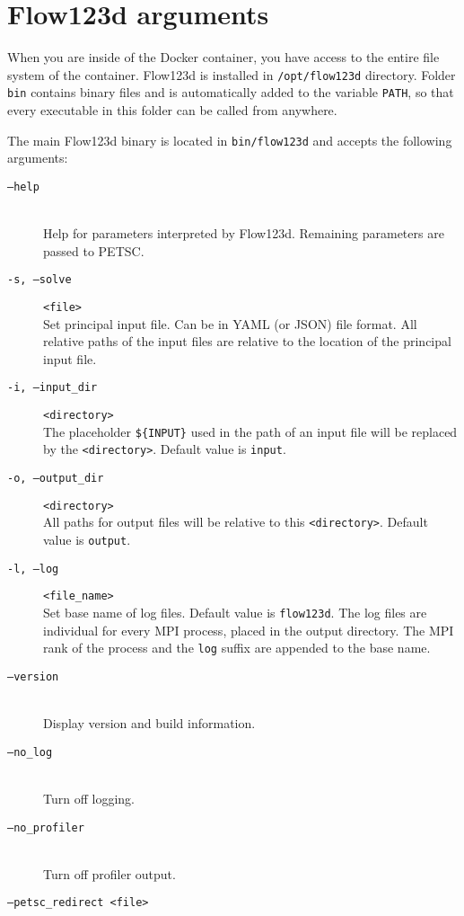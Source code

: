 \section{Flow123d arguments}
When you are inside of the Docker container, you have access to the entire file system of the container. Flow123d is installed in \verb'/opt/flow123d' directory. Folder \verb'bin' contains binary files and is automatically
added to the variable \verb'PATH', so that every executable in this folder can be called from anywhere.

The main Flow123d binary is located in \verb'bin/flow123d' and accepts the following arguments:
\begin{description}
 \item[{\tt --help}] \hfill\\
        Help for parameters interpreted by Flow123d. Remaining parameters are passed to PETSC.
 \item[ {\tt -s, --solve} ] \verb'<file>' \hfill\\
 	 Set principal input file. Can be in YAML (or  JSON) file format. All relative paths of the input
 	 files are relative to the location of the principal input file.
 \item[{\tt -i, --input\_dir}] \verb'<directory>' \hfill\\
 	The placeholder \verb"${INPUT}" %
  	used in the path of an input file will be replaced by the \verb'<directory>'. Default value is \verb'input'.
 \item[{\tt -o, --output\_dir}] \verb'<directory>' \hfill\\
 	All paths for output files will be relative to this \verb'<directory>'. Default value is \verb'output'.
 \item[{\tt -l, --log}] \verb'<file_name>' \hfill\\
 	Set base name of log files. Default value is \verb'flow123d'. The log files are individual for every MPI process, placed in the output directory.
 	The MPI rank of the process and the \verb'log' suffix are appended to the base name.
 \item[{\tt --version}] \hfill\\
        Display version and build information.
 \item[{\tt --no\_log}] \hfill\\
        Turn off logging.
 \item[{\tt --no\_profiler}] \hfill\\
        Turn off profiler output.
 \item[{\tt --petsc\_redirect <file>}] \hfill\\

\end{description}
